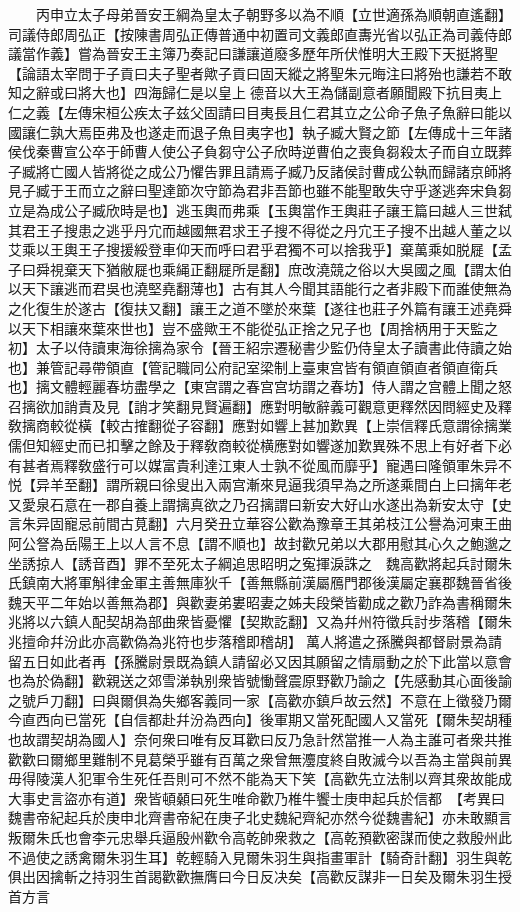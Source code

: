 　　丙申立太子母弟晉安王綱為皇太子朝野多以為不順【立世適孫為順朝直遙翻】司議侍郎周弘正【按陳書周弘正傳普通中初置司文義郎直夀光省以弘正為司義侍郎議當作義】嘗為晉安王主簿乃奏記曰謙讓道廢多歷年所伏惟明大王殿下天挺將聖【論語太宰問于子貢曰夫子聖者歟子貢曰固天縱之將聖朱元晦注曰將殆也謙若不敢知之辭或曰將大也】四海歸仁是以皇上德音以大王為儲副意者願聞殿下抗目夷上仁之義【左傳宋桓公疾太子兹父固請曰目夷長且仁君其立之公命子魚子魚辭曰能以國讓仁孰大焉臣弗及也遂走而退子魚目夷字也】執子臧大賢之節【左傳成十三年諸侯伐秦曹宣公卒于師曹人使公子負芻守公子欣時逆曹伯之喪負芻殺太子而自立既葬子臧將亡國人皆將從之成公乃懼告罪且請焉子臧乃反諸侯討曹成公執而歸諸京師將見子臧于王而立之辭曰聖達節次守節為君非吾節也雖不能聖敢失守乎遂逃奔宋負芻立是為成公子臧欣時是也】逃玉輿而弗乘【玉輿當作王輿莊子讓王篇曰越人三世弑其君王子搜患之逃乎丹宂而越國無君求王子搜不得從之丹宂王子搜不出越人董之以艾乘以王輿王子搜援綏登車仰天而呼曰君乎君獨不可以捨我乎】棄萬乘如脱屣【孟子曰舜視棄天下猶敝屣也乘䋲正翻屣所是翻】庶改澆競之俗以大吳國之風【謂太伯以天下讓逃而君吳也澆堅堯翻薄也】古有其人今聞其語能行之者非殿下而誰使無為之化復生於遂古【復扶又翻】讓王之道不墜於來葉【遂往也莊子外篇有讓王述堯舜以天下相讓來葉來世也】豈不盛歟王不能從弘正捨之兄子也【周捨柄用于天監之初】太子以侍讀東海徐摛為家令【晉王紹宗遷秘書少監仍侍皇太子讀書此侍讀之始也】兼管記尋帶領直【管記職同公府記室梁制上臺東宫皆有領直領直者領直衛兵也】摛文體輕麗春坊盡學之【東宫謂之春宫宫坊謂之春坊】侍人謂之宫體上聞之怒召摛欲加誚責及見【誚才笑翻見賢遍翻】應對明敏辭義可觀意更釋然因問經史及釋敎摛商較從橫【較古搉翻從子容翻】應對如響上甚加歎異【上崇信釋氏意謂徐摛業儒但知經史而已扣擊之餘及于釋敎商較從横應對如響遂加歎異殊不思上有好者下必有甚者焉釋敎盛行可以媒富貴利達江東人士孰不從風而靡乎】寵遇曰隆領軍朱异不悦【异羊至翻】謂所親曰徐叟出入兩宫漸來見逼我須早為之所遂乘間白上曰摛年老又愛泉石意在一郡自養上謂摛真欲之乃召摛謂曰新安大好山水遂出為新安太守【史言朱异固寵忌前間古莧翻】六月癸丑立華容公歡為豫章王其弟枝江公譽為河東王曲阿公詧為岳陽王上以人言不息【謂不順也】故封歡兄弟以大郡用慰其心久之鮑邈之坐誘掠人【誘音酉】罪不至死太子綱追思眧明之寃揮淚誅之　魏高歡將起兵討爾朱氏鎮南大將軍斛律金軍主善無庫狄千【善無縣前漢屬鴈門郡後漢屬定襄郡魏晉省後魏天平二年始以善無為郡】與歡妻弟婁昭妻之姊夫段榮皆勸成之歡乃詐為書稱爾朱兆將以六鎮人配契胡為部曲衆皆憂懼【契欺訖翻】又為幷州符徵兵討步落稽【爾朱兆擅命幷汾此亦高歡偽為兆符也步落稽即稽胡】萬人將遣之孫騰與都督尉景為請留五日如此者再【孫騰尉景既為鎮人請留必又因其願留之情扇動之於下此當以意會也為於偽翻】歡親送之郊雪涕執别衆皆號慟聲震原野歡乃諭之【先感動其心面後諭之號戶刀翻】曰與爾俱為失鄉客義同一家【高歡亦鎮戶故云然】不意在上徵發乃爾今直西向已當死【自信都赴幷汾為西向】後軍期又當死配國人又當死【爾朱契胡種也故謂契胡為國人】奈何衆曰唯有反耳歡曰反乃急計然當推一人為主誰可者衆共推歡歡曰爾鄉里難制不見葛榮乎雖有百萬之衆曾無灋度終自敗滅今以吾為主當與前異毋得陵漢人犯軍令生死任吾則可不然不能為天下笑【高歡先立法制以齊其衆故能成大事史言盜亦有道】衆皆頓顙曰死生唯命歡乃椎牛饗士庚申起兵於信都　【考異曰魏書帝紀起兵於庚申北齊書帝紀在庚子北史魏紀齊紀亦然今從魏書紀】亦未敢顯言叛爾朱氏也會李元忠舉兵逼殷州歡令高乾帥衆救之【高乾預歡密謀而使之救殷州此不過使之誘禽爾朱羽生耳】乾輕騎入見爾朱羽生與指畫軍計【騎奇計翻】羽生與乾俱出因擒斬之持羽生首謁歡歡撫膺曰今日反决矣【高歡反謀非一日矣及爾朱羽生授首方言